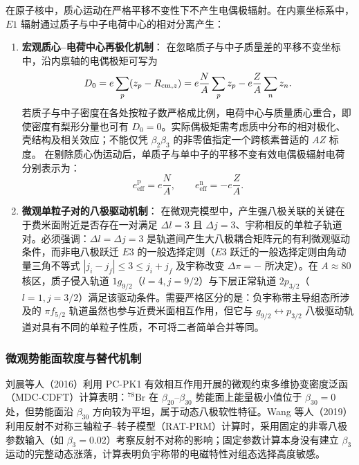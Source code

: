 在原子核中，质心运动在严格平移不变性下不产生电偶极辐射。在内禀坐标系中，$E1$ 辐射通过质子与中子电荷中心的相对分离产生：
\begin{enumerate}
\item \textbf{宏观质心--电荷中心再极化机制}：
在忽略质子与中子质量差的平移不变坐标中，沿内禀轴的电偶极矩可写为
\begin{equation}\label{eq:4-5-myers-dipole}
D_0=e\sum_{p}(z_p-R_{{\rm cm},z})
=e\frac{N}{A}\sum_p z_p-e\frac{Z}{A}\sum_n z_n.
\end{equation}
若质子与中子密度在各处按粒子数严格成比例，电荷中心与质量质心重合，即使密度有梨形分量也可有 $D_0=0$。实际偶极矩需考虑质中分布的相对极化、壳结构及相关效应；不能仅凭 $\beta_2\beta_3$ 的非零值指定一个跨核素普适的 $AZ$ 标度。
在剔除质心伪运动后，单质子与单中子的平移不变有效电偶极辐射电荷分别表示为：
\begin{equation}\label{eq:4-5-effective-charge}
e_{\text{eff}}^{\text{p}} = e \frac{N}{A}, \qquad e_{\text{eff}}^{\text{n}} = -e \frac{Z}{A}.
\end{equation}
\item \textbf{微观单粒子对的八极驱动机制}：
在微观壳模型中，产生强八极关联的关键在于费米面附近是否存在一对满足 $\Delta l = 3$ 且 $\Delta j = 3$、宇称相反的单粒子轨道对。必须强调：$\Delta l = \Delta j = 3$ 是轨道间产生大八极耦合矩阵元的有利微观驱动条件，而非电八极跃迁 $E3$ 的一般选择定则（$E3$ 跃迁的一般选择定则由角动量三角不等式 $|j_i - j_f| \le 3 \le j_i + j_f$ 及宇称改变 $\Delta\pi = -$ 所决定）。在 $A \approx 80$ 核区，质子侵入轨道 $1g_{9/2}$（$l=4, j=9/2$）与下层正常轨道 $2p_{3/2}$（$l=1, j=3/2$）满足该驱动条件。需要严格区分的是：负宇称带主导组态所涉及的 $\pi f_{5/2}$ 轨道虽然也参与近费米面相互作用，但它与 $g_{9/2} \leftrightarrow p_{3/2}$ 八极驱动轨道对具有不同的单粒子性质，不可将二者简单合并等同。
\end{enumerate}

\subsubsection{微观势能面软度与替代机制}

刘晨等人（2016）利用 PC-PK1 有效相互作用开展的微观约束多维协变密度泛函（MDC-CDFT）计算表明：$^{78}\mathrm{Br}$ 在 $\beta_{20}$--$\beta_{30}$ 势能面上能量极小值位于 $\beta_{30} = 0$ 处，但势能面沿 $\beta_{30}$ 方向较为平坦，属于动态八极软性特征。Wang 等人（2019）利用反射不对称三轴粒子--转子模型（RAT-PRM）计算时，采用固定的非零八极参数输入（如 $\beta_3=0.02$）考察反射不对称的影响；固定参数计算本身没有建立 $\beta_3$ 运动的完整动态涨落，计算表明负宇称带的电磁特性对组态选择高度敏感。

